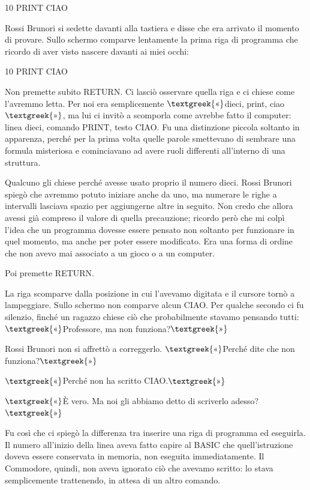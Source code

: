 \documentclass{article}
\begin{document}
10 PRINT {\textquotedbl}CIAO{\textquotedbl}

Rossi Brunori si sedette davanti alla tastiera e disse che era arrivato il momento di provare. Sullo schermo comparve
lentamente la prima riga di programma che ricordo di aver visto nascere davanti ai miei occhi:

10 PRINT {\textquotedbl}CIAO{\textquotedbl}

Non premette subito RETURN. Ci lasciò osservare quella riga e ci chiese come l'avremmo letta. Per noi era semplicemente
$\text{\textgreek{«}}$dieci, print, ciao$\text{\textgreek{»}}$, ma lui ci invitò a scomporla come avrebbe fatto il
computer: linea dieci, comando PRINT, testo CIAO. Fu una distinzione piccola soltanto in apparenza, perché per la prima
volta quelle parole smettevano di sembrare una formula misteriosa e cominciavano ad avere ruoli differenti all'interno
di una struttura.

Qualcuno gli chiese perché avesse usato proprio il numero dieci. Rossi Brunori spiegò che avremmo potuto iniziare anche
da uno, ma numerare le righe a intervalli lasciava spazio per aggiungerne altre in seguito. Non credo che allora avessi
già compreso il valore di quella precauzione; ricordo però che mi colpì l'idea che un programma dovesse essere pensato
non soltanto per funzionare in quel momento, ma anche per poter essere modificato. Era una forma di ordine che non
avevo mai associato a un gioco o a un computer.

Poi premette RETURN.

La riga scomparve dalla posizione in cui l'avevamo digitata e il cursore tornò a lampeggiare. Sullo schermo non comparve
alcun CIAO. Per qualche secondo ci fu silenzio, finché un ragazzo chiese ciò che probabilmente stavamo pensando tutti:
$\text{\textgreek{«}}$Professore, ma non funziona?$\text{\textgreek{»}}$

Rossi Brunori non si affrettò a correggerlo. $\text{\textgreek{«}}$Perché dite che non funziona?$\text{\textgreek{»}}$

$\text{\textgreek{«}}$Perché non ha scritto CIAO.$\text{\textgreek{»}}$

$\text{\textgreek{«}}$È vero. Ma noi gli abbiamo detto di scriverlo adesso?$\text{\textgreek{»}}$

Fu così che ci spiegò la differenza tra inserire una riga di programma ed eseguirla. Il numero all'inizio della linea
aveva fatto capire al BASIC che quell'istruzione doveva essere conservata in memoria, non eseguita immediatamente. Il
Commodore, quindi, non aveva ignorato ciò che avevamo scritto: lo stava semplicemente trattenendo, in attesa di un
altro comando.
\end{document}

